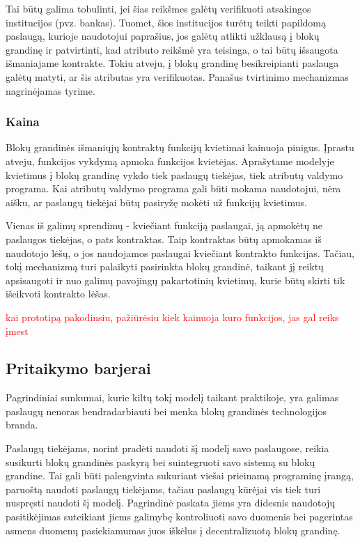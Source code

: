 Tai būtų galima tobulinti, jei šias reikšmes galėtų verifikuoti
atsakingos institucijos (pvz. bankas). Tuomet, šios institucijos turėtų teikti papildomą paslaugą, kurioje naudotojui
paprašius, jos galėtų atlikti užklausą į blokų grandinę ir patvirtinti, kad atributo reikšmė yra teisinga, o tai būtų
išsaugota išmaniajame kontrakte. Tokiu atveju,
į blokų grandinę besikreipianti paslauga galėtų matyti, ar šis atributas yra verifikuotas. Panašus tvirtinimo mechanizmas
nagrinėjamas \cite{Baars2016} tyrime.

\subsubsection{Kaina}

Blokų grandinės išmaniųjų kontraktų funkcijų kvietimai kainuoja pinigus. Įprastu atveju, funkcijos vykdymą apmoka
funkcijos kvietėjas.
Aprašytame modelyje kvietimus į blokų grandinę vykdo tiek paslaugų tiekėjas, tiek atributų valdymo programa. Kai atributų valdymo
programa gali būti mokama naudotojui, nėra aišku, ar paslaugų tiekėjai būtų pasiryžę mokėti už funkcijų kvietimus.

Vienas iš galimų sprendimų - kviečiant funkciją paslaugai, ją apmokėtų ne paslaugos tiekėjas, o pats kontraktas. Taip
kontraktas būtų apmokamas iš naudotojo lėšų, o jos naudojamos paslaugai kviečiant kontrakto funkcijas.
Tačiau, tokį mechanizmą turi palaikyti pasirinkta blokų grandinė, taikant jį reiktų apsisaugoti ir nuo
galimų pavojingų pakartotinių kvietimų, kurie būtų skirti tik išeikvoti kontrakto lėšas.

\textcolor{red}{kai prototipą pakodinsiu, pažiūrėsiu kiek kainuoja kuro funkcijos, jas gal reiks įmest}

\subsection{Pritaikymo barjerai}

Pagrindiniai sunkumai, kurie kiltų tokį modelį taikant praktikoje, yra galimas paslaugų nenoras bendradarbiauti bei menka blokų grandinės
technologijos branda.

Paslaugų tiekėjams, norint pradėti naudoti šį modelį savo paslaugose, reikia susikurti blokų grandinės paskyrą bei suintegruoti
savo sistemą su blokų grandine. Tai gali būti palengvinta sukuriant viešai prieinamą programinę įrangą, paruoštą naudoti paslaugų
tiekėjams, tačiau paslaugų kūrėjai vis tiek turi nuspręsti naudoti šį modelį. Pagrindinė paskata jiems yra didesnis naudotojų pasitikėjimas
suteikiant jiems galimybę kontroliuoti savo duomenis bei pagerintas asmens duomenų pasiekiamumas juos iškėlus į decentralizuotą blokų grandinę.

